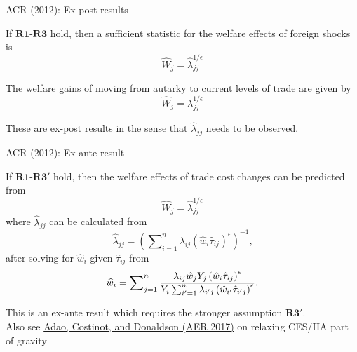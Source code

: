 \documentclass[10pt,notes=hide]{beamer}
\begin{document}
\begin{frame}{ACR (2012): Ex-post results}
\begin{theorem}
If $\mathbf{R1}$-$\mathbf{R3}$ hold, then a sufficient statistic for the welfare effects of
foreign shocks is%
\begin{equation*}
\widehat{W}_{j}=\widehat{\lambda }_{jj}^{1/\epsilon }
\end{equation*}
\end{theorem}
\begin{corollary}
The welfare gains of moving from autarky to current levels of trade are
given by%
\begin{equation*}
\widehat{W}_{j}=\lambda _{jj}^{1/\epsilon }
\end{equation*}
\end{corollary}
These are ex-post results in the sense that $\widehat{\lambda}_{jj}$ needs
to be observed.
\end{frame}
\begin{frame}{ACR (2012): Ex-ante result}
\begin{theorem}
If $\mathbf{R1}$-$\mathbf{R3}'$ hold, then the welfare effects of trade cost changes can be
predicted from%
\begin{equation*}
\widehat{W}_{j}=\widehat{\lambda }_{jj}^{1/\epsilon }
\end{equation*}%
where $\widehat{\lambda }_{jj}$ can be calculated from%
\begin{equation*}
\widehat{\lambda }_{jj}=\left( \sum\nolimits_{i=1}^{n}\lambda _{ij}\left( 
\hat{w}_{i}\hat{\tau}_{ij}\right) ^{\epsilon }\right) ^{-1}\text{,}
\end{equation*}%
after solving for $\widehat{w}_{i}$ given $\hat{\tau}_{ij}$ from%
\begin{equation*}
\widehat{w}_{i}=\sum\nolimits_{j=1}^{n}\frac{\lambda _{ij}\hat{w}%
_{j}Y_{j}\left( \hat{w}_{i}\hat{\tau}_{ij}\right) ^{\epsilon }}{%
Y_{i}\sum\nolimits_{i^{\prime }=1}^{n}\lambda _{i^{\prime }j}\left( \hat{w}%
_{i^{\prime }}\hat{\tau}_{i^{\prime }j}\right) ^{\epsilon }}\text{.}
\end{equation*}
\end{theorem}
This is an ex-ante result which requires the stronger assumption $\mathbf{R3}'$. \\
Also see \href{https://www.aeaweb.org/articles?id=10.1257/aer.20150956}{Adao, Costinot, and Donaldson (AER 2017)} on relaxing CES/IIA part of gravity
\end{frame}%
\end{document}

